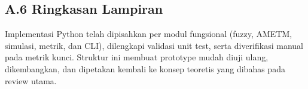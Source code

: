\subsection*{A.6 Ringkasan Lampiran}

Implementasi Python telah dipisahkan per modul fungsional (fuzzy, AMETM,
simulasi, metrik, dan CLI), dilengkapi validasi unit test, serta diverifikasi
manual pada metrik kunci. Struktur ini membuat prototype mudah diuji ulang,
dikembangkan, dan dipetakan kembali ke konsep teoretis yang dibahas pada
review utama.
